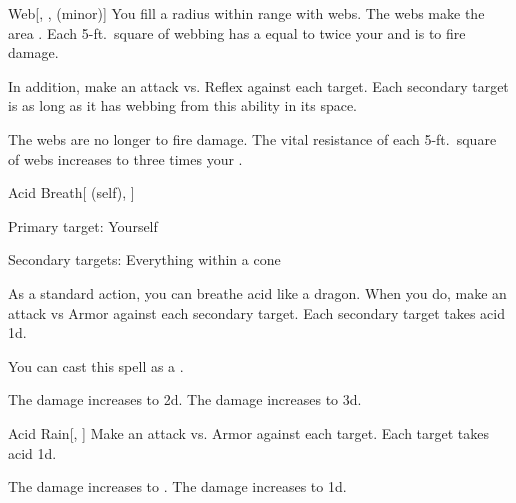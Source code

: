 \lowercase{\hypertarget{spell:Web}{}}\label{spell:Web}
\begin{freeability}[Rank 3]{\hypertarget{spell:Web}{Web}}[, ,  (minor)]
You fill a \areasmall radius  within \rngclose range with webs.
The webs make the area .
Each 5-ft.\ square of webbing has a  equal to twice your  and is  to fire damage.

In addition, make an attack vs. Reflex against each target.
\hit Each secondary target is  as long as it has webbing from this ability in its space.

\rankline
{} The webs are no longer  to fire damage.
 The vital resistance of each 5-ft.\ square of webs increases to three times your .
\end{freeability}
\vspace{0.25em}



\lowercase{\hypertarget{spell:Acid Breath}{}}\label{spell:Acid Breath}
\begin{attuneability}[Rank 4]{\hypertarget{spell:Acid Breath}{Acid Breath}}[ (self), ]

Primary target: Yourself
\par\noindent
Secondary targets: Everything within a \arealarge cone

As a standard action, you can breathe acid like a dragon.
When you do, make an attack vs Armor against each secondary target.
\hit Each secondary target takes acid  \plus1d.

You can cast this spell as a .

\rankline
{} The damage increases to  \plus2d.
 The damage increases to  \plus3d.
\end{attuneability}
\vspace{0.25em}



\lowercase{\hypertarget{spell:Acid Rain}{}}\label{spell:Acid Rain}
\begin{freeability}[Rank 4]{\hypertarget{spell:Acid Rain}{Acid Rain}}[, ]
Make an attack vs. Armor against each target.
\hit Each target takes acid  \minus1d.

\rankline
{} The damage increases to .
 The damage increases to  \plus1d.
\end{freeability}
\vspace{0.25em}



